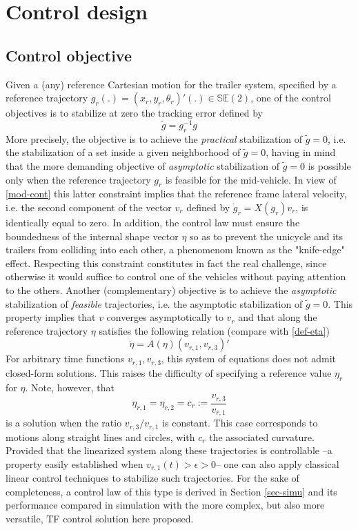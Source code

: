 \documentclass[a4paper,twoside]{article}
\def \SE {{\mathbb S}{\mathbb E}}
\begin{document}
\section{Control design}
\label{sec-control}

\subsection{Control objective}
Given a (any) reference Cartesian motion for the trailer system, specified by a reference  
trajectory  $g_r(.)=(x_r,y_r,\theta_r)'(.) \in \SE(2)$, one of the 
control objectives is to stabilize at zero the tracking error defined by 
\begin{equation} \label{tracking-errors}
\tilde{g}=g_r^{-1}g
\end{equation}
More precisely, the objective is to achieve the {\em practical} stabilization of $\tilde g=0$, i.e. the stabilization of a set inside a given neighborhood of $\tilde g=0$, having in mind that the more demanding objective of {\em asymptotic} 
stabilization of $\tilde g=0$ is possible only when the reference trajectory $g_r$ is feasible for the mid-vehicle. In view of \eqref{mod-cont} this latter constraint implies that the reference frame lateral velocity, i.e. the second component of the vector $v_r$ defined by $\dot{g}_r= X(g_r) v_r$, is identically equal to zero. In addition, the control law must ensure the boundedness of the internal shape vector 
$\eta$ so as to prevent the unicycle and its trailers from colliding into each other, a phenomenom known as the "knife-edge" effect. Respecting this constraint constitutes in fact the real challenge, since otherwise it would suffice to control one of the vehicles without paying attention to the others. Another (complementary) objective is to achieve the {\em asymptotic} stabilization of {\em feasible} trajectories, i.e. the asymptotic stabilization of $\tilde g=0$. This property implies that $v$ converges asymptotically to $v_r$ and that along the reference trajectory $\eta$ satisfies the following relation (compare with \eqref{def-eta})
\begin{equation}
\label{closed-form}
\dot \eta= A(\eta) (v_{r,1},v_{r,3})'
\end{equation}
For arbitrary time functions $v_{r,1},v_{r,3}$, this system of equations does not admit closed-form solutions. This raises the difficulty of specifying a reference value $\eta_r$ for $\eta$. Note, however,
that
\begin{equation}
\label{defetar}
\eta_{r,1} = \eta_{r,2} = c_r := \frac{v_{r,3}}{v_{r,1}}
\end{equation}
is a solution when the ratio $v_{r,3}/v_{r,1}$ is constant. This case corresponds to motions along straight lines and circles, with $c_r$ the associated curvature. Provided that the linearized system along these trajectories is controllable --a property easily established when $v_{r,1}(t)>\epsilon>0$-- one can also apply classical linear control techniques to stabilize such trajectories.
For the sake of completeness, a control law of this type is derived in Section \ref{sec-simu} and its performance compared in simulation with the more complex, but also more versatile, TF control solution here proposed. 
\end{document}
